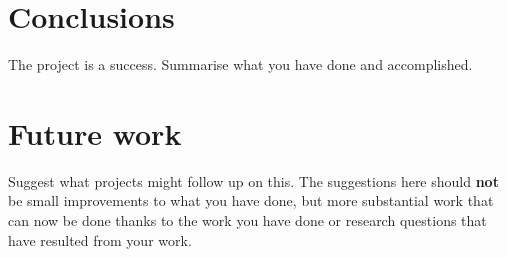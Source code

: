 \section{Conclusions}
\label{ch:conclusions}

The project is a success. Summarise what you have done and accomplished.

\section{Future work}

Suggest what projects might follow up on this. The suggestions here should \textbf{not} be small improvements to what you have done, but more substantial work that can now be done thanks to the work you have done or research questions that have resulted from your work.